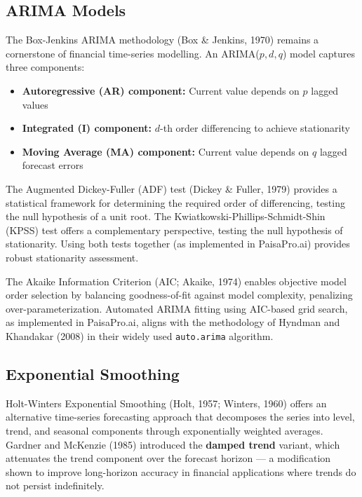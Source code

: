 \documentclass[12pt, a4paper, oneside]{report}
\newcommand{\projectname}{PaisaPro.ai}
\begin{document}
\subsection{ARIMA Models}

The Box-Jenkins ARIMA methodology (Box \& Jenkins, 1970) remains a cornerstone of financial time-series modelling. An ARIMA($p,d,q$) model captures three components:
\begin{itemize}[nosep]
    \item \textbf{Autoregressive (AR) component:} Current value depends on $p$ lagged values
    \item \textbf{Integrated (I) component:} $d$-th order differencing to achieve stationarity
    \item \textbf{Moving Average (MA) component:} Current value depends on $q$ lagged forecast errors
\end{itemize}

The Augmented Dickey-Fuller (ADF) test (Dickey \& Fuller, 1979) provides a statistical framework for determining the required order of differencing, testing the null hypothesis of a unit root. The Kwiatkowski-Phillips-Schmidt-Shin (KPSS) test offers a complementary perspective, testing the null hypothesis of stationarity. Using both tests together (as implemented in \projectname{}) provides robust stationarity assessment.

The Akaike Information Criterion (AIC; Akaike, 1974) enables objective model order selection by balancing goodness-of-fit against model complexity, penalizing over-parameterization. Automated ARIMA fitting using AIC-based grid search, as implemented in \projectname{}, aligns with the methodology of Hyndman and Khandakar (2008) in their widely used \texttt{auto.arima} algorithm.

\subsection{Exponential Smoothing}

Holt-Winters Exponential Smoothing (Holt, 1957; Winters, 1960) offers an alternative time-series forecasting approach that decomposes the series into level, trend, and seasonal components through exponentially weighted averages. Gardner and McKenzie (1985) introduced the \textbf{damped trend} variant, which attenuates the trend component over the forecast horizon --- a modification shown to improve long-horizon accuracy in financial applications where trends do not persist indefinitely.
\end{document}
